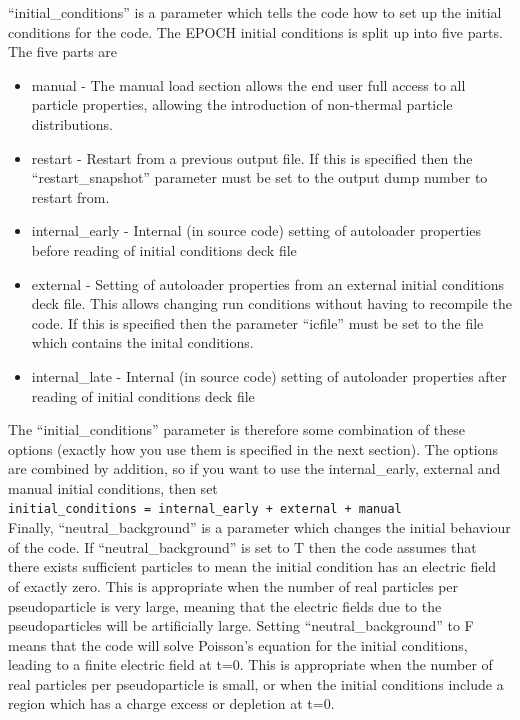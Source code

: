 \documentclass[12pt]{article}
\begin{document}
``initial\_conditions'' is a parameter which tells the code how to set up the initial conditions for the code. The EPOCH initial conditions is split up into five parts. The five parts are
\begin{itemize}
\item manual - The manual load section allows the end user full access to all particle properties, allowing the introduction of non-thermal particle distributions.
\item restart - Restart from a previous output file. If this is specified then the ``restart\_snapshot'' parameter must be set to the output dump number to restart from.
\item internal\_early - Internal (in source code) setting of autoloader properties before reading of initial conditions deck file
\item external - Setting of autoloader properties from an external initial conditions deck file. This allows changing run conditions without having to recompile the code. If this is specified then the parameter ``icfile'' must be set to the file which contains the inital conditions.
\item internal\_late - Internal (in source code) setting of autoloader properties after reading of initial conditions deck file
\end{itemize}
The ``initial\_conditions'' parameter is therefore some combination of these options (exactly how you use them is specified in the next section). The options are combined by addition, so if you want to use the internal\_early, external and manual initial conditions, then set\\
\texttt{initial\_conditions = internal\_early + external + manual}\\

Finally, ``neutral\_background'' is a parameter which changes the initial behaviour of the code. If ``neutral\_background'' is set to T then the code assumes that there exists sufficient particles to mean the initial condition has an electric field of exactly zero. This is appropriate when the number of real particles per pseudoparticle is very large, meaning that the electric fields due to the pseudoparticles will be artificially large. Setting ``neutral\_background'' to F means that the code will solve Poisson's equation for the initial conditions, leading to a finite electric field at t=0. This is appropriate when the number of real particles per pseudoparticle is small, or when the initial conditions include a region which has a charge excess or depletion at t=0.\\
\end{document}
